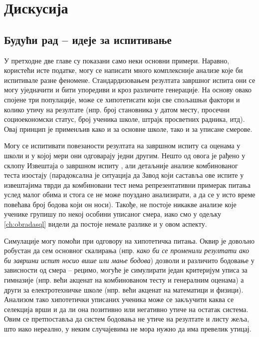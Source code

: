 \chapter{Дискусија}\label{ch:\thechapter}

\section{Будући рад -- идеје за испитивање}

У претходне две главе су показани само неки основни примери. Наравно, користећи исте податке, могу се написати много комплексније анализе које би испитивале разне феномене. Стандардизовањем резултата завршног испита они се могу уједначити и бити упоредиви и кроз различите генерације. На основу овако спојене три популације, може се хипотетисати који све спољашњи фактори и колико утичу на резултате (нпр. број становника у датом месту, просечни социоекономски статус, број ученика школе, штрајк просветних радника, итд). Овај принцип је применљив како и за основне школе, тако и за уписане смерове.

Могу се испитивати повезаности резултата на завршном испиту са оценама у школи и у којој мери они одговарају једни другим. Нешто од овога је рађено у склопу Извештаја о завршном испиту \citep{izvestaj15}\citep{izvestaj16}\citep{izvestaj17}, али детаљније анализе комбинованог теста изостају (парадоксална је ситуација да Завод који саставља ове испите у извештајима тврди да комбиновани тест нема репрезентативни примерак питања услед малог обима и стога се не може поуздано анализирати, а да се у исто време повећава број бодова који он носи). Такође, не постоје никакве анализе које ученике групишу по некој особини уписаног смера, иако смо у одељку \ref{ch:obradasql} видели да постоје немале разлике и у овом аспекту.

Симулације могу помоћи при одговору на хипотетичка питања. Оквир је довољно робустан да сем основног скалирања (нпр. \emph{како би се променили резултати ако би завршни испит носио више или мање бодова}) дозволи и различито бодовање у зависности од смера -- рецимо, могуће је симулирати један критеријум уписа за гимназије (нпр. већи акценат на комбинованом тесту и генералним оценама) а други за електротехничке школе (нпр. већи акценат на математици и физици). Анализом тако хипотетички уписаних ученика може се закључити каква се селекција врши и да ли она позитивно или негативно утиче на остатак система. Овим се претпоставља да систем бодовања не утиче на резултате и листу жеља, што иако нереално, у неким случајевима не мора нужно да има превелик утицај.

